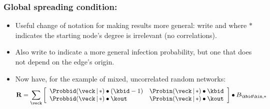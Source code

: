 \begin{frame}
  \frametitle{Global spreading condition:}

  \begin{itemize}
  \item<1->
    Useful change of notation for making results more general:
    write 
    and
    where
    $\ast$ indicates the starting node's degree
    is irrelevant (no correlations).
\item<2->
  Also write
  to indicate a more general infection probability,
  but one that does not depend on the edge's origin.
\item<3->
  Now have, for the example of mixed, uncorrelated random networks:
  $$
  \mathbf{R} 
  =
  \sum_{\veck}
  \left[
    \begin{array}{ll}
      \Probbid(\veck\,|\, \ast)
      \bullet
      (\kbid-1)
      &
      \Probin(\veck\,|\, \ast)
      \bullet
      \kbid
      \\
      \Probbid(\veck\,|\, \ast)
      \bullet
      \kout
      &
      \Probin(\veck\,|\, \ast)
      \bullet
      \kout
      \end{array}
    \right]
    \bullet
    B_{\kbid\kin,\ast}
    $$
   \end{itemize}


\end{frame}

